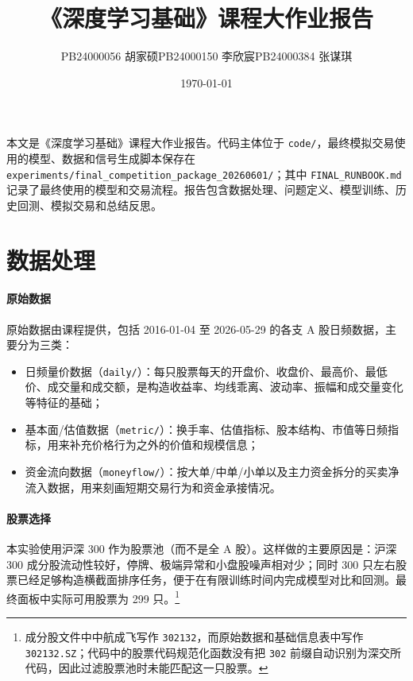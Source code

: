 \documentclass[fontset=mac]{ctexart}
\title{《深度学习基础》课程大作业报告}
\author{PB24000056 胡家硕\quad PB24000150 李欣宸\quad PB24000384 张谋琪}
\date{\today}
\begin{document}
\maketitle

本文是《深度学习基础》课程大作业报告。代码主体位于 \verb|code/|，最终模拟交易使用的模型、数据和信号生成脚本保存在
\verb|experiments/final_competition_package_20260601/|；其中 \verb|FINAL_RUNBOOK.md| 记录了最终使用的模型和交易流程。报告包含数据处理、问题定义、模型训练、历史回测、模拟交易和总结反思。

\section{数据处理}

\paragraph{原始数据}
原始数据由课程提供，包括 2016-01-04 至 2026-05-29 的各支 A 股日频数据，主要分为三类：
\begin{itemize}[noitemsep]
    \item 日频量价数据（\verb|daily/|）：每只股票每天的开盘价、收盘价、最高价、最低价、成交量和成交额，是构造收益率、均线乖离、波动率、振幅和成交量变化等特征的基础；
    \item 基本面/估值数据（\verb|metric/|）：换手率、估值指标、股本结构、市值等日频指标，用来补充价格行为之外的价值和规模信息；
    \item 资金流向数据（\verb|moneyflow/|）：按大单/中单/小单以及主力资金拆分的买卖净流入数据，用来刻画短期交易行为和资金承接情况。
\end{itemize}

\paragraph{股票选择}
本实验使用沪深 300 作为股票池（而不是全 A 股）。这样做的主要原因是：沪深 300 成分股流动性较好，停牌、极端异常和小盘股噪声相对少；同时 300 只左右股票已经足够构造横截面排序任务，便于在有限训练时间内完成模型对比和回测。最终面板中实际可用股票为 299 只。\footnote{成分股文件中中航成飞写作 \texttt{302132}，而原始数据和基础信息表中写作 \texttt{302132.SZ}；代码中的股票代码规范化函数没有把 \texttt{302} 前缀自动识别为深交所代码，因此过滤股票池时未能匹配这一只股票。}
\end{document}
